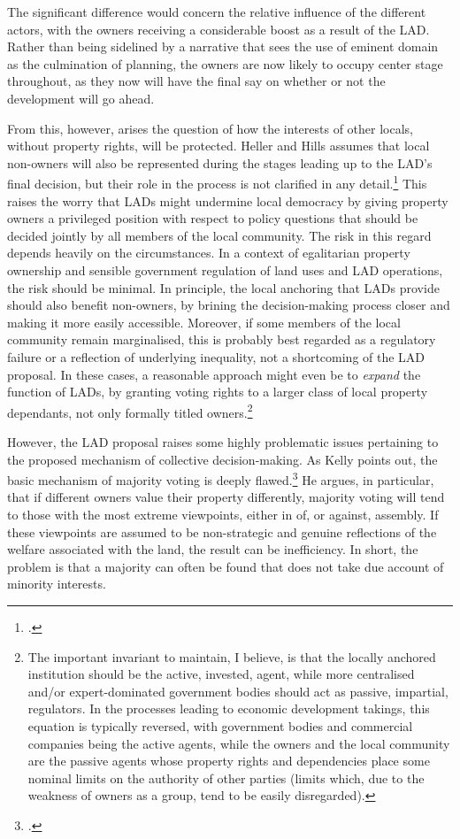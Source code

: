 The significant difference would concern the relative influence of the different actors, with the owners receiving a considerable boost as a result of the LAD. Rather than being sidelined by a narrative that sees the use of eminent domain as the culmination of planning, the owners are now likely to occupy center stage throughout, as they now will have the final say on whether or not the development will go ahead.

From this, however, arises the question of how the interests of other locals, without property rights, will be protected. Heller and Hills assumes that local non-owners will also be represented during the stages leading up to the LAD's final decision, but their role in the process is not clarified in any detail.\footcite[1490-1491]{heller08} This raises the worry that LADs might undermine local democracy by giving property owners a privileged position with respect to policy questions that should be decided jointly by all members of the local community. The risk in this regard depends heavily on the circumstances. In a context of egalitarian property ownership and sensible government regulation of land uses and LAD operations, the risk should be minimal. In principle, the local anchoring that LADs provide should also benefit non-owners, by brining the decision-making process closer and making it more easily accessible. Moreover, if some members of the local community remain marginalised, this is probably best regarded as a regulatory failure or a reflection of underlying inequality, not a shortcoming of the LAD proposal. In these cases, a reasonable approach might even be to {\it expand} the function of LADs, by granting voting rights to a larger class of local property dependants, not only formally titled owners.\footnote{The important invariant to maintain, I believe, is that the locally anchored institution should be the active, invested, agent, while more centralised and/or expert-dominated government bodies should act as passive, impartial, regulators. In the processes leading to economic development takings, this equation is typically reversed, with government bodies and commercial companies being the active agents, while the owners and the local community are the passive agents whose property rights and dependencies place some nominal limits on the authority of other parties (limits which, due to the weakness of owners as a group, tend to be easily disregarded).}

However, the LAD proposal raises some highly problematic issues pertaining to the proposed mechanism of collective decision-making. As Kelly points out, the basic mechanism of majority voting is deeply flawed.\footcite{kelly09} He argues, in particular, that if different owners value their property differently, majority voting will tend to  those with the most extreme viewpoints, either in  of, or against, assembly. If these viewpoints are assumed to be non-strategic and genuine reflections of the welfare associated with the land, the result can be inefficiency. In short, the problem is that a majority can often be found that does not take due account of minority interests. 

